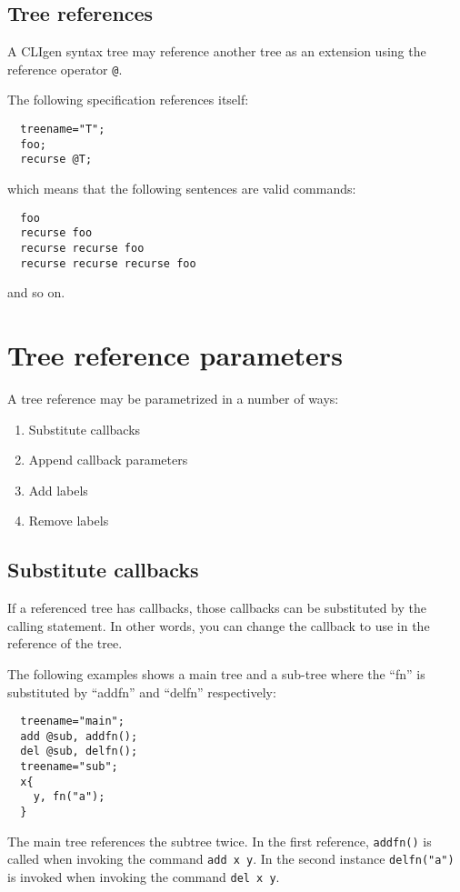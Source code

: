 \documentclass[a4paper, 10pt] {article}
\begin{document}
\subsection{Tree references}

A CLIgen syntax tree may reference another tree as an extension using
the reference operator {\tt @}.

The following specification references itself:
\begin{verbatim}
  treename="T";
  foo;
  recurse @T;
\end{verbatim}
which means that the following sentences are valid commands:
\begin{verbatim}
  foo
  recurse foo
  recurse recurse foo
  recurse recurse recurse foo
\end{verbatim}
and so on.

\section{Tree reference parameters}

A tree reference may be parametrized in a number of ways:
\begin{enumerate}
\item Substitute callbacks
\item Append callback parameters
\item Add labels
\item Remove labels
\end{enumerate}

\subsection{Substitute callbacks}

If a referenced tree has callbacks, those callbacks can be substituted by the calling statement.
In other words, you can change the callback to use in the reference of the
tree.

The following examples shows a main tree and a sub-tree where the ``fn'' is substituted by ``addfn'' and ``delfn'' respectively:

\begin{verbatim}
  treename="main";
  add @sub, addfn();
  del @sub, delfn();
  treename="sub";
  x{
    y, fn("a");
  }
\end{verbatim}

The main tree references the subtree twice. In the first reference,
{\tt addfn()} is called when invoking the command {\tt add x y}. In the
second instance {\tt delfn("a")} is invoked when invoking the command {\tt del x y}.
\end{document}
